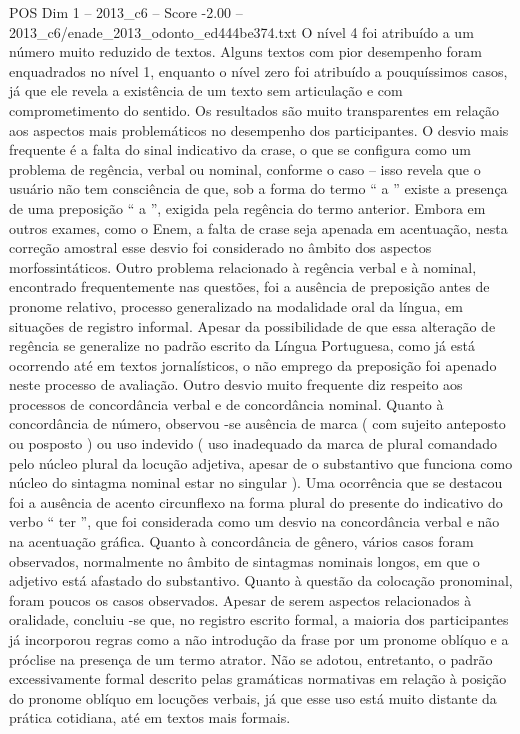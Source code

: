 \begin{textsample}{POS Dim 1 – 2013\_c6 – Score -2.00 – 2013\_c6/enade\_2013\_odonto\_ed444be374.txt}
O nível 4 foi atribuído a um número muito reduzido de textos.
Alguns textos com pior desempenho foram enquadrados no nível 1, enquanto o nível zero foi atribuído a pouquíssimos casos, já que ele revela a existência de um texto sem articulação e com comprometimento do sentido.
Os resultados são muito transparentes em relação aos aspectos mais problemáticos no desempenho dos participantes.
O desvio mais frequente é a falta do sinal indicativo da crase, o que se configura como um problema de regência, verbal ou nominal, conforme o caso – isso revela que o usuário não tem consciência de que, sob a forma do termo “ a ” existe a presença de uma preposição “ a ”, exigida pela regência do termo anterior.
Embora em outros exames, como o Enem, a falta de crase seja apenada em acentuação, nesta correção amostral esse desvio foi considerado no âmbito dos aspectos morfossintáticos.
Outro problema relacionado à regência verbal e à nominal, encontrado frequentemente nas questões, foi a ausência de preposição antes de pronome relativo, processo generalizado na modalidade oral da língua, em situações de registro informal.
Apesar da possibilidade de que essa alteração de regência se generalize no padrão escrito da Língua Portuguesa, como já está ocorrendo até em textos jornalísticos, o não emprego da preposição foi apenado neste processo de avaliação.
Outro desvio muito frequente diz respeito aos processos de concordância verbal e de concordância nominal.
Quanto à concordância de número, observou -se ausência de marca ( com sujeito anteposto ou posposto ) ou uso indevido ( uso inadequado da marca de plural comandado pelo núcleo plural da locução adjetiva, apesar de o substantivo que funciona como núcleo do sintagma nominal estar no singular ).
Uma ocorrência que se destacou foi a ausência de acento circunflexo na forma plural do presente do indicativo do verbo “ ter ”, que foi considerada como um desvio na concordância verbal e não na acentuação gráfica.
Quanto à concordância de gênero, vários casos foram observados, normalmente no âmbito de sintagmas nominais longos, em que o adjetivo está afastado do substantivo.
Quanto à questão da colocação pronominal, foram poucos os casos observados.
Apesar de serem aspectos relacionados à oralidade, concluiu -se que, no registro escrito formal, a maioria dos participantes já incorporou regras como a não introdução da frase por um pronome oblíquo e a próclise na presença de um termo atrator.
Não se adotou, entretanto, o padrão excessivamente formal descrito pelas gramáticas normativas em relação à posição do pronome oblíquo em locuções verbais, já que esse uso está muito distante da prática cotidiana, até em textos mais formais.

\end{textsample}
